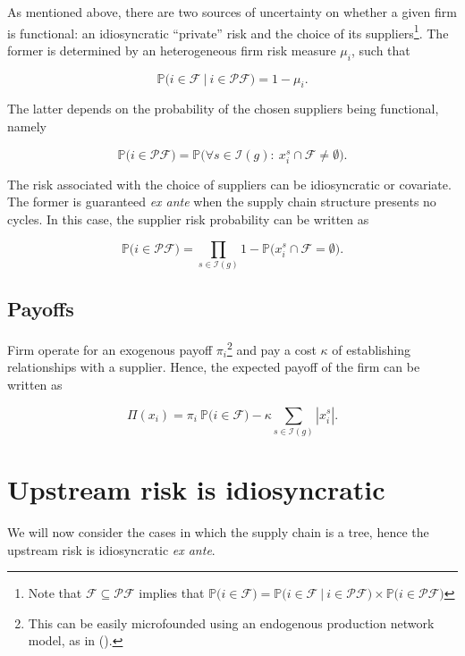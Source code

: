 \documentclass[american, abstract=on]{scrartcl}
\newcommand{\F}{\mathcal{F}}
\newcommand{\I}{\mathcal{I}}
\newcommand{\PF}{\mathcal{P} \F}
\renewcommand{\P}{\mathbb{P}}
\newcommand{\abs}[1]{\left\lvert#1\right\rvert}
\newcommand{\citein}[1]{\citeauthor{#1} (\citeyear{#1})}
\begin{document}
As mentioned above, there are two sources of uncertainty on whether a given firm is functional: an idiosyncratic ``private'' risk and the choice of its suppliers\footnote{Note that $\F \subseteq \PF$ implies that $\P\Big(i \in \F \Big) = \P\Big(i \in \F \ \vert \ i \in \PF \Big) \times \P\Big( i \in \PF \Big)$}. The former is determined by an heterogeneous firm risk measure $\mu_i$, such that  

\begin{equation}
  \P\Big(i \in \F \ \vert \ i \in \PF \Big) = 1 - \mu_i.
\end{equation}

The latter depends on the probability of the chosen suppliers being functional, namely

\begin{equation}
  \P\Big( i \in \PF \Big) = \P\Big( \forall s \in \I(g): \ x_i^s \cap \F \neq \emptyset \Big).
\end{equation}

The risk associated with the choice of suppliers can be idiosyncratic or covariate. The former is guaranteed \textit{ex ante} when the supply chain structure presents no cycles. In this case, the supplier risk probability can be written as 

\begin{equation}
  \P\Big( i \in \PF \Big) = \prod_{s \in \I(g)} 1 - \P\Big( x^s_i \cap \F = \emptyset\Big).
\end{equation}

\subsection{Payoffs}

Firm operate for an exogenous payoff $\pi_i$\footnote{This can be easily microfounded using an endogenous production network model, as in \citein{acemoglu_endogenous_2020}.} and pay a cost $\kappa$ of establishing relationships with a supplier. Hence, the expected payoff of the firm can be written as

\begin{equation}
  \Pi(x_i) = \pi_i \ \P\Big( i \in \F \Big) - \kappa \sum_{s \in \I(g)} \abs{x^s_i}.
\end{equation}

\section{Upstream risk is idiosyncratic}

We will now consider the cases in which the supply chain is a tree, hence the upstream risk is idiosyncratic \textit{ex ante}.
\end{document}
